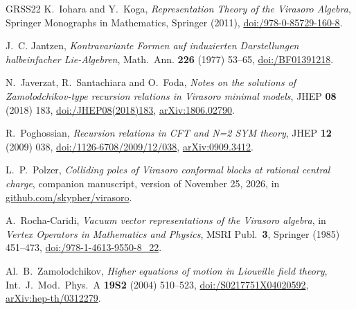 \documentclass[twoside,10pt]{article}
\numberwithin{equation}{section}
\theoremstyle{slbody}
\theoremstyle{definition}
\theoremstyle{remark}
\begin{document}
{\begin{thebibliography}{GRSS22}
K.~Iohara and Y.~Koga,
\emph{Representation Theory of the Virasoro Algebra},
Springer Monographs in Mathematics, Springer (2011),
\href{https://doi.org/10.1007/978-0-85729-160-8}%
{doi:/978-0-85729-160-8}.

J.~C. Jantzen,
\emph{Kontravariante Formen auf induzierten Darstellungen halbeinfacher
Lie-Algebren},
Math.\ Ann. \textbf{226} (1977) 53--65,
\href{https://doi.org/10.1007/BF01391218}%
{doi:/BF01391218}.

N.~Javerzat, R.~Santachiara and O.~Foda,
\emph{Notes on the solutions of Zamolodchikov-type recursion relations in
Virasoro minimal models},
JHEP \textbf{08} (2018) 183,
\href{https://doi.org/10.1007/JHEP08(2018)183}%
{doi:/JHEP08(2018)183},
\href{https://arxiv.org/abs/1806.02790}{arXiv:1806.02790}.

R.~Poghossian,
\emph{Recursion relations in CFT and N=2 SYM theory},
JHEP \textbf{12} (2009) 038,
\href{https://doi.org/10.1088/1126-6708/2009/12/038}%
{doi:/1126-6708/2009/12/038},
\href{https://arxiv.org/abs/0909.3412}{arXiv:0909.3412}.

L.~P.~Polzer,
\emph{Colliding poles of Virasoro conformal blocks at rational central
charge},
companion manuscript, version of November 25, 2026, in \href{https://github.com/skypher/virasoro}{github.com/skypher/virasoro}.

A.~Rocha-Caridi,
\emph{Vacuum vector representations of the Virasoro algebra},
in \emph{Vertex Operators in Mathematics and Physics},
MSRI Publ.\ \textbf{3}, Springer (1985) 451--473,
\href{https://doi.org/10.1007/978-1-4613-9550-8_22}{doi:/978-1-4613-9550-8\_22}.

Al.~B.~Zamolodchikov,
\emph{Higher equations of motion in Liouville field theory},
Int.\ J.\ Mod.\ Phys.\ A \textbf{19S2} (2004) 510--523,
\href{https://doi.org/10.1142/S0217751X04020592}{doi:/S0217751X04020592},
\href{https://arxiv.org/abs/hep-th/0312279}{arXiv:hep-th/0312279}.

\end{thebibliography}
}
\end{document}
